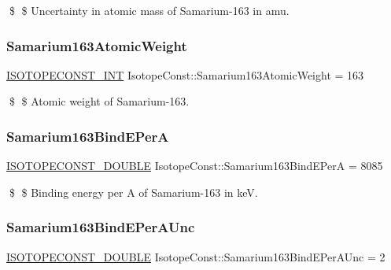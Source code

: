 \$ \$ Uncertainty in atomic mass of Samarium-\/163 in amu. \mbox{\label{group___isotope_const-_samarium-_sm163_ga2880865bf713dde06718f5cb3568192f}} 
\subsubsection{\texorpdfstring{Samarium163\+Atomic\+Weight}{Samarium163AtomicWeight}}
{\footnotesize\ttfamily \mbox{\hyperlink{group___isotope_const-_macros_ga5f18360b3e99483a35c32d789e62621c}{I\+S\+O\+T\+O\+P\+E\+C\+O\+N\+S\+T\+\_\+\+I\+NT}} Isotope\+Const\+::\+Samarium163\+Atomic\+Weight = 163}

\$ \$ Atomic weight of Samarium-\/163. \mbox{\label{group___isotope_const-_samarium-_sm163_ga1920dcd69a73145933c250ae098e5e3f}} 
\subsubsection{\texorpdfstring{Samarium163\+Bind\+E\+PerA}{Samarium163BindEPerA}}
{\footnotesize\ttfamily \mbox{\hyperlink{group___isotope_const-_macros_ga8f45a7272ce02c0b4c65c44636ed719a}{I\+S\+O\+T\+O\+P\+E\+C\+O\+N\+S\+T\+\_\+\+D\+O\+U\+B\+LE}} Isotope\+Const\+::\+Samarium163\+Bind\+E\+PerA = 8085}

\$ \$ Binding energy per A of Samarium-\/163 in keV. \mbox{\label{group___isotope_const-_samarium-_sm163_ga995bee7afaac30fc0ec05fce802ea238}} 
\subsubsection{\texorpdfstring{Samarium163\+Bind\+E\+Per\+A\+Unc}{Samarium163BindEPerAUnc}}
{\footnotesize\ttfamily \mbox{\hyperlink{group___isotope_const-_macros_ga8f45a7272ce02c0b4c65c44636ed719a}{I\+S\+O\+T\+O\+P\+E\+C\+O\+N\+S\+T\+\_\+\+D\+O\+U\+B\+LE}} Isotope\+Const\+::\+Samarium163\+Bind\+E\+Per\+A\+Unc = 2}

